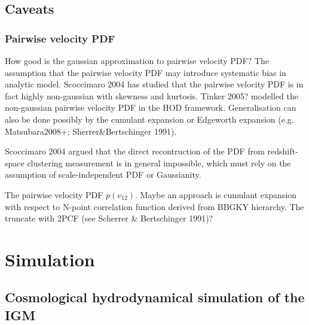\documentclass[useAMS,usenatbib,twocolumn]{mn2e}
\begin{document}
\subsection{Caveats}
\subsubsection{Pairwise velocity PDF}
How good is the gaussian approximation to pairwise velocity PDF? The assumption
that the pairwise velocity PDF may introduce systematic bias in analytic model.
Scoccimaro 2004 has studied that the pairwise velocity PDF is in fact highly
non-gaussian with skewness and kurtosis. Tinker 2005? modelled the non-gaussian
pairwise velocity PDF in the HOD framework. Generalisation can also be done
possibly by the cumulant expansion or Edgeworth expansion 
(e.g. Matsubara2008+; Sherrer\&Bertschinger 1991).

Scoccimaro 2004 argued that the direct recontruction of the PDF from 
redshift-space clustering measurement is in general impossible, which
must rely on the assumption of scale-independent PDF or Gaussianity.


The pairwise velocity PDF $p(v_{12})$. Maybe an approach is cumulant
expansion with respect to N-point correlation function derived from 
BBGKY hierarchy. The truncate with 2PCF (see Scherrer \& Bertschinger 1991)? 


\section{Simulation}
\subsection{Cosmological hydrodynamical simulation of the IGM}
\end{document}
